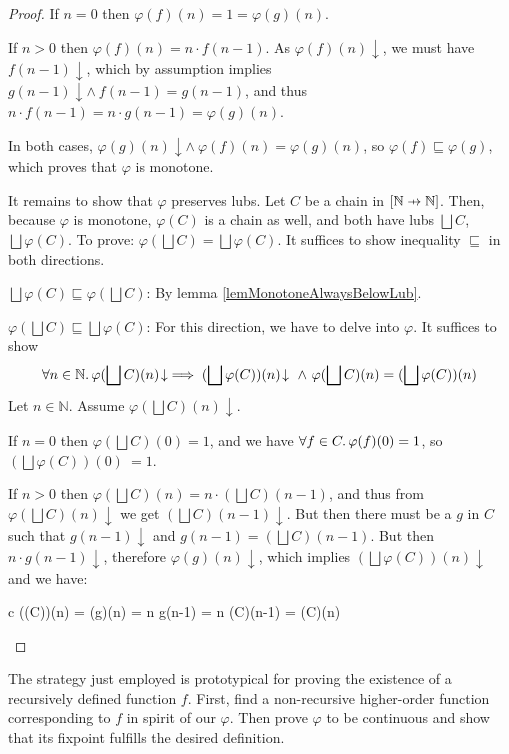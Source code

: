 \documentclass[a4paper]{article}
\newcommand{\below}{\sqsubseteq}
\newcommand{\lub}{\bigsqcup}
\newcommand{\pfun}{\mathrel{\ooalign{\hfil$\mapstochar\mkern5mu$\hfil\cr$\to$\cr}}}
\newcommand{\isdefined}{\!\downarrow}
\newcommand{\bbN}{\mathbb{N}}
\begin{document}
\begin{proof}
If $n = 0$ then $\varphi(f)(n) = 1 = \varphi(g)(n)$.

If $n > 0$ then $\varphi(f)(n) = n \cdot
f(n - 1)$. As $\varphi(f)(n)\isdefined$, we must have
$f(n-1)\isdefined$, which by assumption implies $g(n-1)\isdefined \wedge\
f(n-1) = g(n-1)$, and thus $n \cdot f(n-1) = n \cdot g(n-1) = \varphi(g)(n)$.

In both cases, $\varphi(g)(n)\isdefined \wedge\ \varphi(f)(n) = \varphi(g)(n)$,
so $\varphi(f) \below \varphi(g)$, which proves that $\varphi$ is monotone.

It remains to show that $\varphi$ preserves lubs. Let $C$ be a chain in
$[\bbN \pfun \bbN]$. Then, because $\varphi$ is monotone,
$\varphi(C)$ is a chain as well, and both have lubs $\lub C$, $\lub \varphi(C)$.
To prove: $\varphi(\lub C) = \lub \varphi(C)$. It suffices to show inequality
$\below$ in both directions.

$\lub \varphi(C) \below \varphi(\lub C)$: By lemma
\ref{lemMonotoneAlwaysBelowLub}.

$\varphi(\lub C) \below \lub \varphi(C)$: For this direction, we have to delve
into $\varphi$. It suffices to show
\begin{equation*}
  \forall n \in \bbN \ldotp \varphi(\lub C)(n)\isdefined \implies
  (\lub \varphi(C))(n)\isdefined\ \wedge\ \varphi(\lub C)(n) = (\lub
  \varphi(C))(n)
\end{equation*}
Let $n \in \bbN$. Assume $\varphi(\lub C)(n)\isdefined$.

If $n = 0$ then $\varphi(\lub C)(0) = 1$, and we have $\forall f \in C
\ldotp \varphi(f)(0) = 1$, so $(\lub \varphi(C))(0)~= 1$.

If $n > 0$ then $\varphi(\lub C)(n) = n \cdot (\lub C)(n - 1)$, and thus from
$\varphi(\lub C)(n)\isdefined$ we get $(\lub C)(n - 1)\isdefined$. But then
there must be a $g$ in $C$ such that $g(n-1)\isdefined$ and $g(n-1) = (\lub C)(n
- 1)$. But then $n \cdot g(n-1)\isdefined$, therefore $\varphi(g)(n)\isdefined$,
which implies $(\lub \varphi(C))(n)\isdefined$ and we have:
\begin{IEEEeqnarray*}{c}
(\lub \varphi(C))(n) = \varphi(g)(n) = n \cdot g(n-1) = n \cdot (\lub C)(n-1)
 = \varphi(\lub C)(n)
\end{IEEEeqnarray*}

\end{proof}


The strategy just employed is prototypical for proving the existence of a
recursively defined function $f$. First, find a non-recursive higher-order
function corresponding to $f$ in spirit of our $\varphi$. Then prove $\varphi$
to be continuous and show that its fixpoint fulfills the desired definition.
\end{document}
